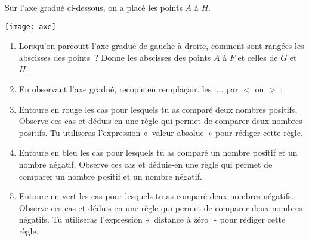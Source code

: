 
\begin{activite}
Sur l'axe gradué ci-dessous, on a placé les points $A$ à $H$.

\begin{center} \texttt{[image: axe]} \end{center}

 \begin{enumerate}
  \item Lorsqu'on parcourt l'axe gradué de gauche à droite, comment sont rangées les abscisses des points ? Donne les abscisses des points $A$ à $F$ et celles de $G$ et $H$.
  \item En observant l'axe gradué, recopie en remplaçant les .... par $<$ ou $>$ :
  \item Entoure en rouge les cas pour lesquels tu as comparé deux nombres positifs. Observe ces cas et déduis-en une règle qui permet de comparer deux nombres positifs. Tu utiliseras l'expression « valeur absolue » pour rédiger cette règle. 
  \item Entoure en bleu les cas pour lesquels tu as comparé un nombre positif et un nombre négatif. Observe ces cas et déduis-en une règle qui permet de comparer un nombre positif et un nombre négatif.
  \item Entoure en vert les cas pour lesquels tu as comparé deux nombres négatifs. Observe ces cas et déduis-en une règle qui permet de comparer deux nombres négatifs. Tu utiliseras l'expression « distance à zéro » pour rédiger cette règle.
  \end{enumerate}
  
\end{activite}

